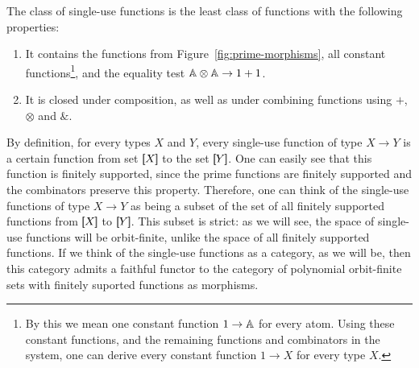 

   


\begin{definition} The class of single-use functions is the least class of functions with the following properties:
        \begin{enumerate}
            \item It contains the functions from Figure~\ref{fig:prime-morphisms}, all constant functions\footnote{By this we mean one constant function $1 \to \mathbb A$ for every atom. Using these constant functions, and the remaining functions and combinators in the system, one can derive every constant function $1 \to X$ for every type $X$.}, and the equality test $\mathbb A \otimes \mathbb A \to 1+1$.
            \item It is closed under composition, as well as under combining functions using  $+$, $\otimes$ and $\&$. 
        \end{enumerate}
\end{definition}

By definition, for every types $X$ and $Y$, every single-use function of type $X \to Y$ is a certain function from set $[\!\![X]\!\!]$ to the set $[\!\![Y]\!\!]$. One can easily see that this function is  finitely supported, since the prime functions are finitely supported and the combinators preserve this property.  Therefore, one can think of the single-use functions of type $X \to Y$ as being a subset of the set of all finitely supported functions from $[\!\![X]\!\!]$ to $[\!\![Y]\!\!]$. This subset is strict: as we will see, the space of single-use functions will be orbit-finite, unlike the space of all finitely supported functions. If we think of the single-use functions as a category, as we will be, then this category admits a faithful functor to the category of polynomial orbit-finite sets with finitely suported functions as morphisms.


